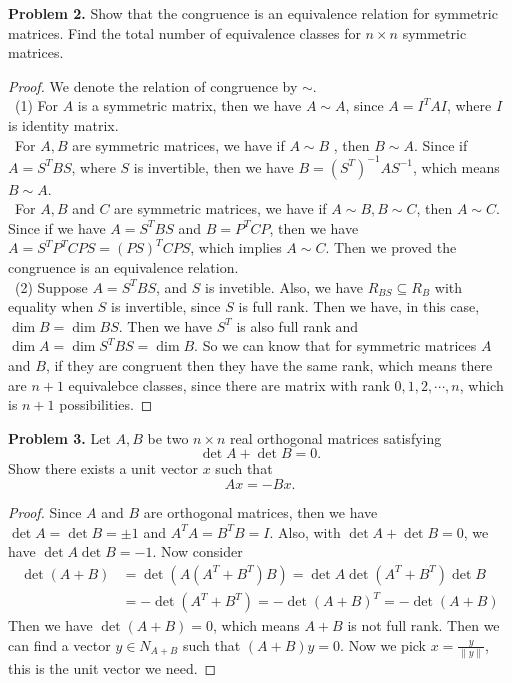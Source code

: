 \documentclass[12pt,leqno]{amsart}
\theoremstyle{definition}
\begin{document}
\medskip

\noindent \textbf{Problem 2.}
Show that the congruence is an equivalence relation for symmetric
matrices. Find the total number of equivalence classes for $n\times n$
symmetric matrices.
\begin{proof}We denote the relation of congruence by $\sim$. \\
\hspace*{1em}\, (1) For $A$ is a symmetric matrix, then we have $A\sim A$, since $A = I^TAI$, where $I$ is identity matrix. \\
\hspace*{1em}\, For $A,B$ are symmetric matrices, we have if $A\sim B$ , then $B\sim A$. Since if $A = S^TBS$, where $S$ is invertible, then we have $B = (S^T)^{-1}AS^{-1}$, which means $B\sim A$.\\
\hspace*{1em}\, For $A,B$ and $C$ are symmetric matrices, we have if $A\sim B,B\sim C$, then $A\sim C$. Since if we have $A = S^TBS$ and $B = P^TCP$, then we have $A = S^TP^TCPS = (PS)^TCPS$, which implies $A\sim C$. Then we proved the congruence is an equivalence relation. \\
\hspace*{1em}\, (2) Suppose $A = S^TBS$, and $S$ is invetible. Also, we have $R_{BS}\subseteq R_{B}$ with equality when $S$ is invertible, since $S$ is full rank. Then we have, in this case, $\dim B = \dim BS$. Then we have $S^T$ is also full rank and $\dim A = \dim S^TBS = \dim B$. So we can know that for symmetric matrices $A$ and $B$, if they are congruent then they have the same rank, which means there are $n+1$ equivalebce classes, since there are matrix with rank $0,1,2,\cdots,n$, which is $n+1$ possibilities.
\end{proof}

\medskip

\noindent \textbf{Problem 3.} 
Let $A,B$ be two $n\times n$ real orthogonal matrices satisfying
$$
\det A+\det B=0.
$$
Show there exists a unit vector $x$ such that%
$$
Ax=-Bx.
$$

\begin{proof}
Since $A$ and $B$ are orthogonal matrices, then we have $\det A = \det B = \pm 1$ and $A^TA = B^TB = I$. Also, with $\det A+\det B=0$, we have $\det A\det B = -1$. Now consider 
\begin{align*}
    \det(A+B) &= \det(A(A^T+B^T)B) = \det A \det(A^T+B^T) \det B \\
    & = - \det(A^T+B^T) = - \det(A+B)^T = - \det(A+B)
\end{align*}
Then we have $\det(A+B) = 0$, which means $A+B$ is not full rank. Then we can find a vector $y\in N_{A+B}$ such that $(A+B)y = 0$. Now we pick $x = \frac{y}{\|y\|}$, this is the unit vector we need.
\end{proof}
\end{document}
